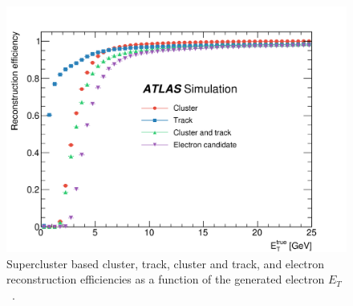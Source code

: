 \begin{figure}[h]
    \centering
    \includegraphics[width=\mediumfigwidth]{images/supercluster_reco.png}
    \caption[Supercluster based cluster, track, cluster and track, and electron reconstruction efficiencies as a function of the generated electron $E_T$ ]{Supercluster based cluster, track, cluster and track, and electron reconstruction efficiencies as a function of the generated electron $E_T$~\cite{Aad:2019tso}.}
    \label{fig:method:screco}
\end{figure}


